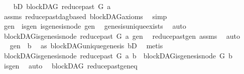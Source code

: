 \begin{isabellebody}
\ \ \isamarkupfalse%
\ bD{\isacharcolon}{\kern0pt}\ {\isachardoublequoteopen}blockDAG\ {\isacharparenleft}{\kern0pt}reduce{\isacharunderscore}{\kern0pt}past\ G\ a{\isacharparenright}{\kern0pt}{\isachardoublequoteclose}\ \isamarkupfalse%
\ assms\ reduce{\isacharunderscore}{\kern0pt}past{\isacharunderscore}{\kern0pt}dagbased\ blockDAG{\isacharunderscore}{\kern0pt}axioms\ \isamarkupfalse%
\ simp\isanewline
\ \ \isamarkupfalse%
\ gen\ \ is{\isacharunderscore}{\kern0pt}gen{\isacharcolon}{\kern0pt}\ {\isachardoublequoteopen}is{\isacharunderscore}{\kern0pt}genesis{\isacharunderscore}{\kern0pt}node\ gen{\isachardoublequoteclose}\ \isamarkupfalse%
\ genesis{\isacharunderscore}{\kern0pt}unique{\isacharunderscore}{\kern0pt}exists\ \isamarkupfalse%
\ auto\isanewline
\ \ \isamarkupfalse%
\ \isamarkupfalse%
\ {\isachardoublequoteopen}blockDAG{\isachardot}{\kern0pt}is{\isacharunderscore}{\kern0pt}genesis{\isacharunderscore}{\kern0pt}node\ {\isacharparenleft}{\kern0pt}reduce{\isacharunderscore}{\kern0pt}past\ G\ a{\isacharparenright}{\kern0pt}\ gen{\isachardoublequoteclose}\ \isamarkupfalse%
\ reduce{\isacharunderscore}{\kern0pt}past{\isacharunderscore}{\kern0pt}gen\ assms\ \isamarkupfalse%
\ auto\isanewline
\ \ \isamarkupfalse%
\ \isamarkupfalse%
\ {\isachardoublequoteopen}gen\ {\isacharequal}{\kern0pt}\ b{\isachardoublequoteclose}\ \isamarkupfalse%
\ as{}\ blockDAG{\isachardot}{\kern0pt}unique{\isacharunderscore}{\kern0pt}genesis\ bD\ \isamarkupfalse%
\ metis\isanewline
\ \ \isamarkupfalse%
\ \isamarkupfalse%
\ {\isachardoublequoteopen}blockDAG{\isachardot}{\kern0pt}is{\isacharunderscore}{\kern0pt}genesis{\isacharunderscore}{\kern0pt}node\ {\isacharparenleft}{\kern0pt}reduce{\isacharunderscore}{\kern0pt}past\ G\ a{\isacharparenright}{\kern0pt}\ b\ {\isasymLongrightarrow}\ blockDAG{\isachardot}{\kern0pt}is{\isacharunderscore}{\kern0pt}genesis{\isacharunderscore}{\kern0pt}node\ G\ b{\isachardoublequoteclose}\isanewline
\ \ \ \ \isamarkupfalse%
\ is{\isacharunderscore}{\kern0pt}gen\ \isamarkupfalse%
\ auto\isanewline
{}\isamarkupfalse%
%
\endisatagproof
{\isafoldproof}%
%
\isadelimproof
\isanewline
%
\endisadelimproof
\isanewline
{}\isamarkupfalse%
\ {\isacharparenleft}{\kern0pt}\ blockDAG{\isacharparenright}{\kern0pt}\ reduce{\isacharunderscore}{\kern0pt}past{\isacharunderscore}{\kern0pt}gen{\isacharunderscore}{\kern0pt}eq{\isacharcolon}{\kern0pt}\isanewline

\end{isabellebody}
